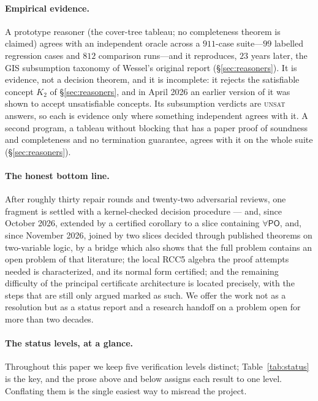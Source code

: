 \documentclass[11pt]{article}
\newcommand{\PO}{\mathsf{PO}}
\theoremstyle{plain}
\theoremstyle{definition}
\begin{document}
\paragraph{Empirical evidence.} A prototype reasoner (the cover-tree
tableau; no completeness theorem is claimed) agrees with an independent
oracle across a $911$-case suite---$99$ labelled regression cases and $812$
comparison runs---and
it reproduces, $23$ years later, the GIS subsumption
taxonomy of Wessel's original report (\S\ref{sec:reasoners}). It is
evidence, not a decision theorem, and it is incomplete: it rejects the
satisfiable concept $K_2$ of \S\ref{sec:reasoners}, and in April 2026 an
earlier version of it was shown to accept unsatisfiable concepts. Its
subsumption verdicts are \textsc{unsat} answers, so each is evidence only where
something independent agrees with it. A second program, a tableau without
blocking that has a paper proof of soundness and completeness and no
termination guarantee, agrees with it on the whole suite
(\S\ref{sec:reasoners}).

\paragraph{The honest bottom line.} After roughly thirty repair rounds and
twenty-two adversarial reviews, one fragment is settled with a
kernel-checked decision procedure --- and, since October 2026, extended by a
certified corollary to a slice containing $\forall\PO$, and, since November
2026, joined by two slices decided through published theorems on two-variable
logic, by a bridge which also shows that the full problem contains an open
problem of that literature; the local RCC5 algebra the proof attempts
needed is characterized, and its normal form certified; and the remaining
difficulty of the principal certificate architecture is located precisely,
with the steps that are still only argued marked as such. We offer the work
not as a resolution but as a status report and a research handoff on a
problem open for more than two decades.

\paragraph{The status levels, at a glance.} Throughout this paper we keep
five verification levels distinct; Table~\ref{tab:status} is the key, and
the prose above and below assigns each result to one level. Conflating
them is the single easiest way to misread the project.
\end{document}
